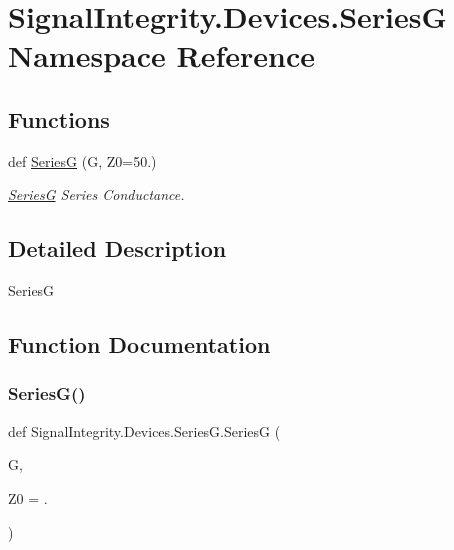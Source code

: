 \hypertarget{namespaceSignalIntegrity_1_1Devices_1_1SeriesG}{}\section{Signal\+Integrity.\+Devices.\+SeriesG Namespace Reference}
\label{namespaceSignalIntegrity_1_1Devices_1_1SeriesG}
\subsection*{Functions}
\begin{DoxyCompactItemize}
\item 
def \hyperlink{namespaceSignalIntegrity_1_1Devices_1_1SeriesG_ae20ca521cee3c128cc38dc8cca9e5e62}{SeriesG} (G, Z0=50.)
\begin{DoxyCompactList}\small\item\em \hyperlink{namespaceSignalIntegrity_1_1Devices_1_1SeriesG}{SeriesG} Series Conductance. \end{DoxyCompactList}\end{DoxyCompactItemize}


\subsection{Detailed Description}
\begin{DoxyVerb}SeriesG\end{DoxyVerb}
 

\subsection{Function Documentation}
\mbox{\label{namespaceSignalIntegrity_1_1Devices_1_1SeriesG_ae20ca521cee3c128cc38dc8cca9e5e62}} 
\subsubsection{\texorpdfstring{Series\+G()}{SeriesG()}}
{\footnotesize\ttfamily def Signal\+Integrity.\+Devices.\+Series\+G.\+SeriesG (\begin{DoxyParamCaption}\item[{}]{G,  }\item[{}]{Z0 = {.} }\end{DoxyParamCaption})}



